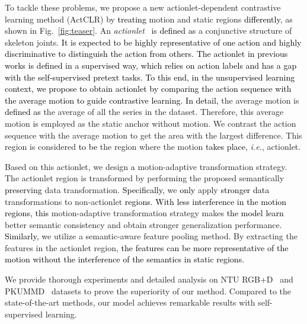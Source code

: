 \documentclass[twocolumn]{article}
\newcommand{\wh}[1]{\textcolor{black}{#1}}
\begin{document}
To tackle these problems, we propose a new actionlet-dependent contrastive learning method (ActCLR) by \wh{treating} motion and static regions \wh{differently}, as shown in Fig.~\ref{fig:teaser}.
An \textit{actionlet}~\cite{wang2012mining} is \wh{defined as} a conjunctive structure of skeleton joints. \wh{It is expected to be highly representative of one action and highly discriminative to distinguish the action from others.}
\wh{The actionlet in previous works is defined in a supervised way, which relies on action labels and has a gap with the self-supervised pretext tasks.}
\wh{To this end, in the unsupervised learning context, we propose to obtain actionlet by comparing the action sequence with the average motion to guide contrastive learning. In detail,} the average motion is \wh{defined as} the average of all the series in the dataset.
Therefore, this average motion is employed as the static anchor without motion. 
We contrast the action sequence with the average motion to get the area with the largest difference. 
This region is considered \wh{to be} the region where the motion \wh{takes place}, \textit{i.e.}, actionlet.


Based on this actionlet, we design \wh{a} motion-adaptive transformation strategy. 
The actionlet region is transformed by performing the proposed semantically \wh{preserving} data transformation.
\wh{Specifically,} we \wh{only} apply \wh{stronger data} transformations to non-actionlet \wh{regions}. \wh{With less interference in the motion regions, this} motion-adaptive transformation strategy makes \wh{the model learn} better semantic consistency and obtain stronger generalization performance.
\wh{Similarly,} we utilize a semantic-aware feature pooling method\wh{.} By extracting the features in the actionlet region, \wh{the features can be more representative of the motion without the interference of the semantics in static regions.}



We provide thorough experiments and detailed analysis on NTU RGB+D~\cite{shahroudy2016ntu,liu2019ntu} and PKUMMD~\cite{liu2020pku} datasets to prove the superiority of our method. 
Compared to the state-of-the-art methods, our model achieves remarkable results with self-supervised learning.
\end{document}
